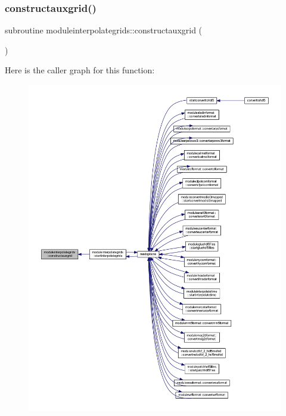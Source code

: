 \subsubsection{\texorpdfstring{constructauxgrid()}{constructauxgrid()}}
{\footnotesize\ttfamily subroutine moduleinterpolategrids\+::constructauxgrid (\begin{DoxyParamCaption}{ }\end{DoxyParamCaption})\hspace{0.3cm}{\ttfamily [private]}}

Here is the caller graph for this function\+:\nopagebreak
\begin{figure}[H]
\begin{center}
\leavevmode
\includegraphics[width=350pt]{namespacemoduleinterpolategrids_ae09eebd1096118a9d8f6af67ad2eeb67_icgraph}
\end{center}
\end{figure}
\mbox{\label{namespacemoduleinterpolategrids_a1563ccf4009718586332881b09394382}} 
